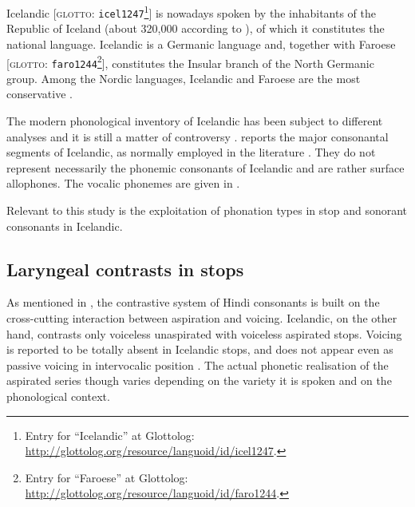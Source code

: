 \documentclass[11pt,a4paper,openany]{memoir}\usepackage[]{graphicx}\usepackage[]{color}
\begin{document}
Icelandic [\textsc{glotto}: \texttt{icel1247}\footnote{Entry for ``Icelandic'' at Glottolog: \url{http://glottolog.org/resource/languoid/id/icel1247}.}] is nowadays spoken by the inhabitants of the Republic of Iceland (about 320,000 according to \citealt{arnason2011}), of which it constitutes the national language.
Icelandic is a Germanic language and, together with Faroese [\textsc{glotto}: \texttt{faro1244}\footnote{Entry for ``Faroese'' at Glottolog: \url{http://glottolog.org/resource/languoid/id/faro1244}.}], constitutes the Insular branch of the North Germanic group.
Among the Nordic languages, Icelandic and Faroese are the most conservative \citep{harbert2006,konig2013}.

The modern phonological inventory of Icelandic has been subject to different analyses and it is still a matter of controversy \citep{thraisson1978,jessen1998,arnason2011}.
 reports the major consonantal segments of Icelandic, as normally employed in the literature \citep[98]{arnason2011}.
They do not represent necessarily the phonemic consonants of Icelandic and are rather surface allophones.
The vocalic phonemes are given in  \citep[60]{arnason2011}.



Relevant to this study is the exploitation of phonation types in stop and sonorant consonants in Icelandic.

\subsection{Laryngeal contrasts in stops}

As mentioned in , the contrastive system of Hindi consonants is built on the cross-cutting interaction between aspiration and voicing.
Icelandic, on the other hand, contrasts only voiceless unaspirated with voiceless aspirated stops.
Voicing is reported to be totally absent in Icelandic stops, and does not appear even as passive voicing in intervocalic position \citep{arnason2011}.
The actual phonetic realisation of the aspirated series though varies depending on the variety it is spoken and on the phonological context.
\end{document}
